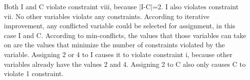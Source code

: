 \begin{enumerate}
{\color{red} Both I and C violate constraint viii, because $\vert$I-C$\vert$=2. I also violates constraint vii. No other variables violate any constraints. According to iterative improvement, any conflicted variable could be selected for assignment, in this case I and C. According to min-conflicts, the values that those variables can take on are the values that minimize the number of constraints violated by the variable. Assigning 2 or 4 to I causes it to violate constraint i, because other variables already have the values 2 and 4. Assigning 2 to C also only causes C to violate 1 constraint.
}

\end{enumerate}